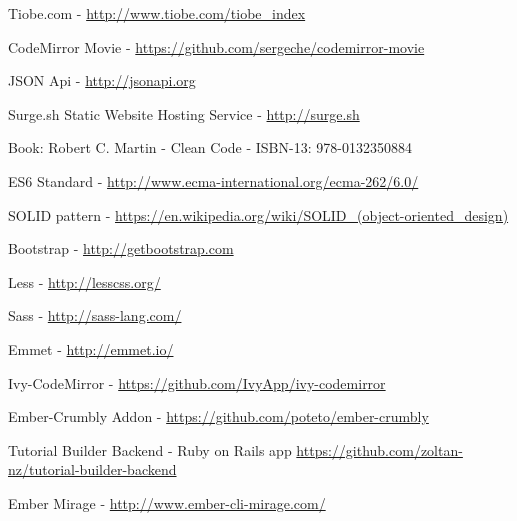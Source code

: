 \documentclass[12pt, a4paper, oneside, openright, medskipamount]{report}
\begin{document}

\backmatter




\begin{thebibliography}{9}

Tiobe.com - \url{http://www.tiobe.com/tiobe_index}

CodeMirror Movie - \url{https://github.com/sergeche/codemirror-movie}

JSON Api - \url{http://jsonapi.org}

Surge.sh Static Website Hosting Service - \url{http://surge.sh}

Book: Robert C. Martin - Clean Code - ISBN-13: 978-0132350884

ES6 Standard - \url{http://www.ecma-international.org/ecma-262/6.0/}

SOLID pattern - \url{https://en.wikipedia.org/wiki/SOLID_(object-oriented_design)}

Bootstrap - \url{http://getbootstrap.com}

Less - \url{http://lesscss.org/}

Sass - \url{http://sass-lang.com/}

Emmet - \url{http://emmet.io/}

Ivy-CodeMirror - \url{https://github.com/IvyApp/ivy-codemirror}

Ember-Crumbly Addon - \url{https://github.com/poteto/ember-crumbly}

Tutorial Builder Backend - Ruby on Rails app \url{https://github.com/zoltan-nz/tutorial-builder-backend}

Ember Mirage - \url{http://www.ember-cli-mirage.com/}

\end{thebibliography}

\end{document}

